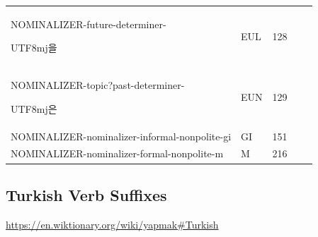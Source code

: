 \documentclass[11pt,letterpaper]{article}
\newcommand{\korean}[1]{\begin{CJK}{UTF8}{mj}#1\end{CJK}}
\begin{document}
\begin{longtable}{lllll}
NOMINALIZER-future-determiner-\korean{을} & EUL &	 128 \\
NOMINALIZER-topic?past-determiner-\korean{은} & EUN&	 129 \\
NOMINALIZER-nominalizer-informal-nonpolite-gi & GI &	 151 \\
NOMINALIZER-nominalizer-formal-nonpolite-m 	& M & 216 \\
\end{longtable}


\subsection{Turkish Verb Suffixes}

\url{https://en.wiktionary.org/wiki/yapmak#Turkish}
\end{document}

